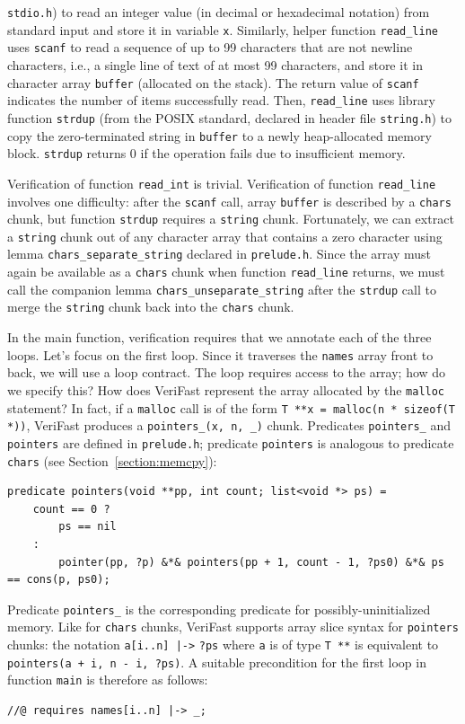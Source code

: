 \documentclass{article}
\begin{document}
\lstinline!stdio.h!) to read an integer value (in decimal or
hexadecimal notation) from standard input and store it in
variable \lstinline!x!. Similarly, helper function
\lstinline!read_line! uses \lstinline!scanf! to read a sequence
of up to 99 characters that are not newline characters, i.e., a
single line of text of at most 99 characters, and store it in
character array \lstinline!buffer! (allocated on the stack).
The return value of \lstinline!scanf! indicates the number of
items successfully read. Then, \lstinline!read_line! uses
library function \lstinline!strdup! (from the POSIX standard,
declared in header file \lstinline!string.h!) to copy the
zero-terminated string in \lstinline!buffer! to a newly
heap-allocated memory block. \lstinline!strdup! returns 0 if
the operation fails due to insufficient memory.

Verification of function \lstinline!read_int! is trivial.
Verification of function \lstinline!read_line! involves one
difficulty: after the \lstinline!scanf! call, array
\lstinline!buffer! is described by a \lstinline!chars! chunk,
but function \lstinline!strdup! requires a \lstinline!string!
chunk. Fortunately, we can extract a \lstinline!string! chunk
out of any character array that contains a zero character using
lemma \lstinline!chars_separate_string! declared in
\lstinline!prelude.h!. Since the array must again be available
as a \lstinline!chars! chunk when function
\lstinline!read_line! returns, we must call the companion lemma
\lstinline!chars_unseparate_string! after the
\lstinline!strdup! call to merge the \lstinline!string! chunk
back into the \lstinline!chars! chunk.

In the main function, verification requires that we annotate
each of the three loops. Let's focus on the first loop. Since
it traverses the \lstinline!names! array front to back, we will
use a loop contract. The loop requires access to the array; how
do we specify this? How does VeriFast represent the array
allocated by the \lstinline!malloc! statement? In fact, if a
\lstinline!malloc! call is of the form %
\lstinline!T **x = malloc(n * sizeof(T *))!, VeriFast produces
a \lstinline!pointers_(x, n, _)! chunk. Predicates
\lstinline!pointers_! and \lstinline|pointers| are defined in \lstinline!prelude.h!; predicate \lstinline!pointers! is
analogous to predicate \lstinline!chars! (see
Section~\ref{section:memcpy}):
\begin{lstlisting}
predicate pointers(void **pp, int count; list<void *> ps) =
    count == 0 ?
        ps == nil
    :
        pointer(pp, ?p) &*& pointers(pp + 1, count - 1, ?ps0) &*& ps == cons(p, ps0);
\end{lstlisting}
Predicate \lstinline!pointers_! is the corresponding predicate for possibly-uninitialized memory.
Like for \lstinline!chars! chunks, VeriFast supports array
slice syntax for \lstinline!pointers! chunks: the notation
\lstinline!a[i..n] |->! \lstinline!?ps! where \lstinline!a! is
of type
\lstinline!T **! is equivalent to %
\lstinline!pointers(a + i, n - i, ?ps)!. A suitable
precondition for the first loop in function \lstinline!main! is
therefore as follows:
\begin{lstlisting}
//@ requires names[i..n] |-> _;
\end{lstlisting}
\end{document}
